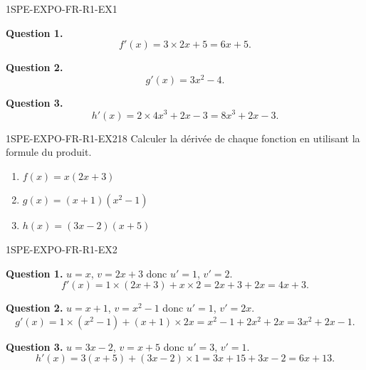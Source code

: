 \begin{corrige}{1SPE-EXPO-FR-R1-EX1}


\textbf{Question 1.}
\[
f'(x) = 3 \times 2x + 5 = 6x + 5.
\]

\textbf{Question 2.}
\[
g'(x) = 3x^2 - 4.
\]

\textbf{Question 3.}
\[
h'(x) = 2 \times 4x^3 + 2x - 3 = 8x^3 + 2x - 3.
\]

\end{corrige}


\begin{exercice}{1SPE-EXPO-FR-R1-EX2}{1}{8}
Calculer la dérivée de chaque fonction en utilisant la formule du produit.
\begin{enumerate}
  \item $f(x) = x(2x + 3)$
  \item $g(x) = (x + 1)(x^2 - 1)$
  \item $h(x) = (3x - 2)(x + 5)$
\end{enumerate}
\end{exercice}



\begin{corrige}{1SPE-EXPO-FR-R1-EX2}


\textbf{Question 1.} $u = x$, $v = 2x+3$ donc $u' = 1$, $v' = 2$.
\[
f'(x) = 1 \times (2x+3) + x \times 2 = 2x + 3 + 2x = 4x + 3.
\]

\textbf{Question 2.} $u = x+1$, $v = x^2-1$ donc $u' = 1$, $v' = 2x$.
\[
g'(x) = 1 \times (x^2 - 1) + (x+1) \times 2x = x^2 - 1 + 2x^2 + 2x = 3x^2 + 2x - 1.
\]

\textbf{Question 3.} $u = 3x-2$, $v = x+5$ donc $u' = 3$, $v' = 1$.
\[
h'(x) = 3(x+5) + (3x-2) \times 1 = 3x + 15 + 3x - 2 = 6x + 13.
\]

\end{corrige}

